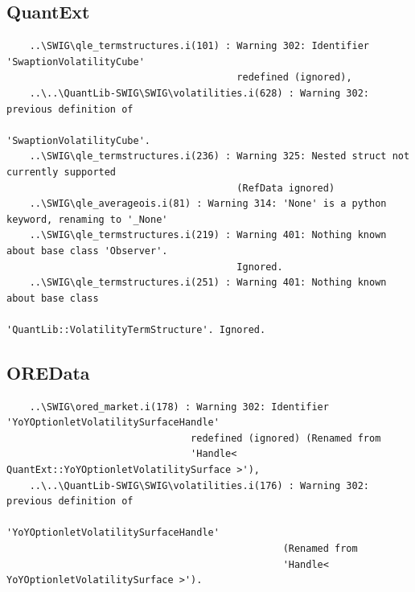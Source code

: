 \documentclass[10pt]{article}
\begin{document}
\subsection{QuantExt}
\begin{verbatim}
    ..\SWIG\qle_termstructures.i(101) : Warning 302: Identifier 'SwaptionVolatilityCube'
                                        redefined (ignored),
    ..\..\QuantLib-SWIG\SWIG\volatilities.i(628) : Warning 302: previous definition of
                                                   'SwaptionVolatilityCube'.
    ..\SWIG\qle_termstructures.i(236) : Warning 325: Nested struct not currently supported
                                        (RefData ignored)
    ..\SWIG\qle_averageois.i(81) : Warning 314: 'None' is a python keyword, renaming to '_None'
    ..\SWIG\qle_termstructures.i(219) : Warning 401: Nothing known about base class 'Observer'.
                                        Ignored.
    ..\SWIG\qle_termstructures.i(251) : Warning 401: Nothing known about base class
                                        'QuantLib::VolatilityTermStructure'. Ignored.

\end{verbatim}

\subsection{OREData}
\begin{verbatim}
    ..\SWIG\ored_market.i(178) : Warning 302: Identifier 'YoYOptionletVolatilitySurfaceHandle'
                                redefined (ignored) (Renamed from
                                'Handle< QuantExt::YoYOptionletVolatilitySurface >'),
    ..\..\QuantLib-SWIG\SWIG\volatilities.i(176) : Warning 302: previous definition of
                                                'YoYOptionletVolatilitySurfaceHandle'
                                                (Renamed from
                                                'Handle< YoYOptionletVolatilitySurface >').
\end{verbatim}
\end{document}
